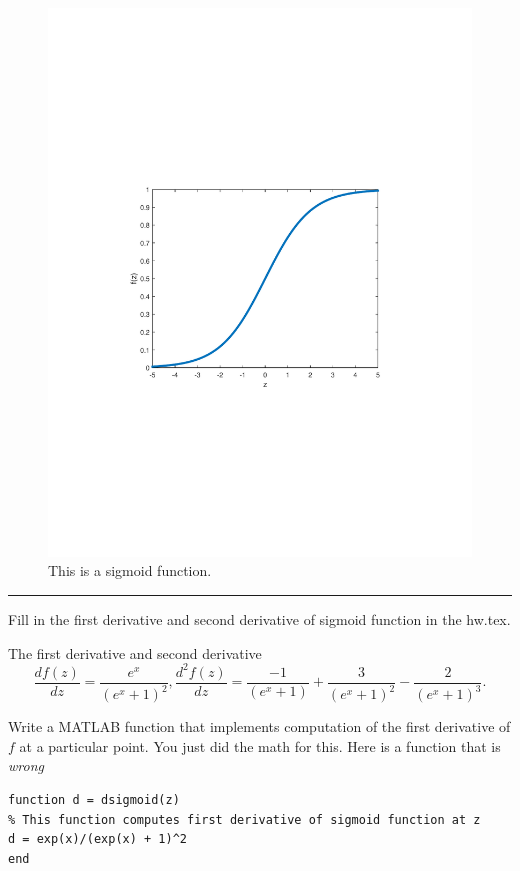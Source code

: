 \documentclass{article}
\begin{document}
\begin{figure}[H]
\begin{center}
\includegraphics[scale=0.5]{sigmoid.pdf}
\caption{This is a sigmoid function.}
\end{center}
\end{figure}

\hrule

\newproblem{0.5pt}
Fill in the first derivative and second derivative of sigmoid function in the hw\theHW.tex.

The first derivative and second derivative
\[
\frac{d f(z)}{dz} =  \frac{e^x}{(e^x + 1)^2}, 
\frac{d^2 f(z)}{dz} =  \frac{-1}{(e^x + 1)}+\frac{3}{(e^x+1)^2}-\frac{2}{(e^x+1)^3}.
\]

\newproblem{0.5pt}
Write a MATLAB function that implements computation  of the first derivative of $f$ at a particular point. You just did the math for this.
Here is a function that is {\em wrong}
\begin{verbatim}
function d = dsigmoid(z)
% This function computes first derivative of sigmoid function at z
d = exp(x)/(exp(x) + 1)^2
end
\end{verbatim}
\end{document}
